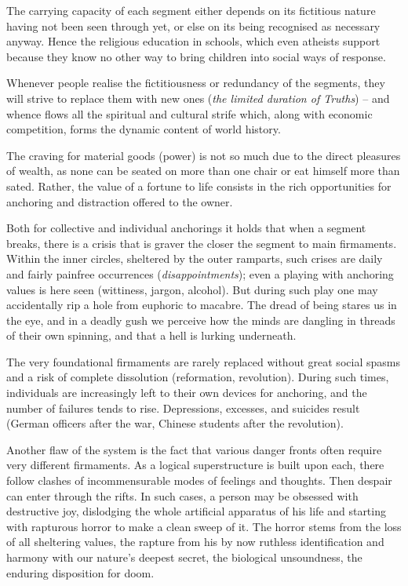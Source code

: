 \documentclass[draft,a4paper,10pt,twocolumn]{article}
\begin{document}
The carrying capacity of each segment either depends on its fictitious nature having not been seen through yet, or else on its being recognised as necessary anyway. Hence the religious education in schools, which even atheists support because they know no other way to bring children into social ways of response.

Whenever people realise the fictitiousness or redundancy of the segments, they will strive to replace them with new ones (\emph{the limited duration of Truths}) -- and whence flows all the spiritual and cultural strife which, along with economic competition, forms the dynamic content of world history.

The craving for material goods (power) is not so much due to the direct pleasures of wealth, as none can be seated on more than one chair or eat himself more than sated. Rather, the value of a fortune to life consists in the rich opportunities for anchoring and distraction offered to the owner.

Both for collective and individual anchorings it holds that when a segment breaks, there is a crisis that is graver the closer the segment to main firmaments. Within the inner circles, sheltered by the outer ramparts, such crises are daily and fairly painfree occurrences (\emph{disappointments}); even a playing with anchoring values is here seen (wittiness, jargon, alcohol). But during such play one may accidentally rip a hole from euphoric to macabre. The dread of being stares us in the eye, and in a deadly gush we perceive how the minds are dangling in threads of their own spinning, and that a hell is lurking underneath.

The very foundational firmaments are rarely replaced without great social spasms and a risk of complete dissolution (reformation, revolution). During such times, individuals are increasingly left to their own devices for anchoring, and the number of failures tends to rise. Depressions, excesses, and suicides result (German officers after the war, Chinese students after the revolution).

Another flaw of the system is the fact that various danger fronts often require very different firmaments. As a logical superstructure is built upon each, there follow clashes of incommensurable modes of feelings and thoughts. Then despair can enter through the rifts. In such cases, a person may be obsessed with destructive joy, dislodging the whole artificial apparatus of his life and starting with rapturous horror to make a clean sweep of it. The horror stems from the loss of all sheltering values, the rapture from his by now ruthless identification and harmony with our nature's deepest secret, the biological unsoundness, the enduring disposition for doom.
\end{document}
